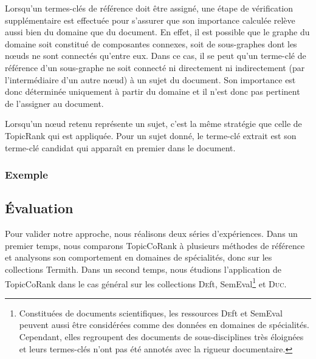         Lorsqu'un termes-clés de référence doit être assigné, une étape de
        vérification supplémentaire est effectuée pour s'assurer que son
        importance calculée relève aussi bien du domaine que du document. En
        effet, il est possible que le graphe du domaine soit constitué de
        composantes connexes, soit de sous-graphes dont les n\oe{}uds ne sont
        connectés qu'entre eux. Dans ce cas, il se peut qu'un terme-clé de
        référence d'un sous-graphe ne soit connecté ni directement ni
        indirectement (par l'intermédiaire d'un autre n\oe{}ud) à un sujet du
        document. Son importance est donc déterminée uniquement à partir du
        domaine et il n'est donc pas pertinent de l'assigner au document.

        Lorsqu'un n\oe{}ud retenu représente un sujet, c'est la même stratégie
        que celle de TopicRank qui est appliquée. Pour un sujet donné, le
        terme-clé extrait est son terme-clé candidat qui apparaît en premier
        dans le document.

      \subsubsection{Exemple}
      \label{subsubsec:main-domain_specific_keyphrase_annotation-supervised_automatic_keyphrase_extraction-topiccorank-exemple}
        \TODO{\dots}

    \subsection{Évaluation}
    \label{subsec:main-domain_specific_keyphrase_annotation-supervised_automatic_keyphrase_annotation-evaluation}
      Pour valider notre approche, nous réalisons deux séries d'expériences.
      Dans un premier temps, nous comparons TopicCoRank à plusieurs méthodes de
      référence et analysons son comportement en domaines de spécialités, donc
      sur les collections Termith. Dans un second temps, nous étudions
      l'application de TopicCoRank dans le cas général sur les collections
      \textsc{De}ft, SemEval\footnote{Constituées de documents scientifiques,
      les ressources \textsc{De}ft et SemEval peuvent aussi être considérées
      comme des données en domaines de spécialités. Cependant, elles regroupent
      des documents de sous-disciplines très éloignées et leurs termes-clés
      n'ont pas été annotés avec la rigueur documentaire.} et \textsc{Duc}.

